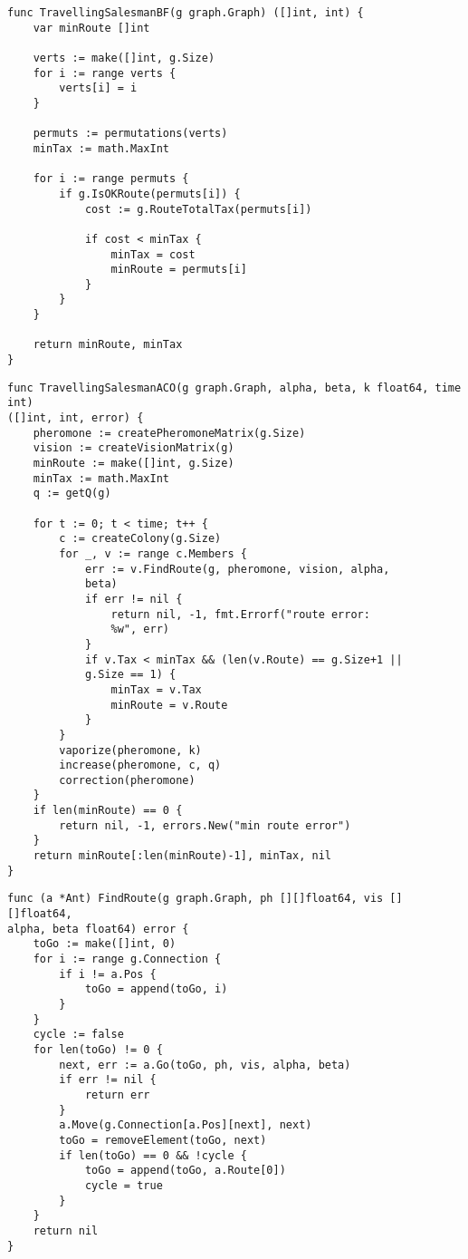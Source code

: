 \begin{code}
\caption{Листинг функции реализации алгоритма полного перебора для решения задачи коммивояджёра}
\label{code:bf}
\begin{verbatim}
func TravellingSalesmanBF(g graph.Graph) ([]int, int) {
	var minRoute []int
	
	verts := make([]int, g.Size)
	for i := range verts {
		verts[i] = i
	}

	permuts := permutations(verts)
	minTax := math.MaxInt
	
	for i := range permuts {
		if g.IsOKRoute(permuts[i]) {
			cost := g.RouteTotalTax(permuts[i])
			
			if cost < minTax {
				minTax = cost
				minRoute = permuts[i]
			}
		}
	}
	
	return minRoute, minTax
}
\end{verbatim}
\end{code}

\newpage

\begin{code}
\caption{Листинг функции реализации муравьиного алгоритма для решения задачи коммивояджёра}
\label{code:aco}
\begin{verbatim}
func TravellingSalesmanACO(g graph.Graph, alpha, beta, k float64, time int) 
([]int, int, error) { 
	pheromone := createPheromoneMatrix(g.Size)
	vision := createVisionMatrix(g)
	minRoute := make([]int, g.Size)
	minTax := math.MaxInt
	q := getQ(g)

	for t := 0; t < time; t++ {
		c := createColony(g.Size)
		for _, v := range c.Members {
			err := v.FindRoute(g, pheromone, vision, alpha, 
			beta)
			if err != nil {
				return nil, -1, fmt.Errorf("route error: 
				%w", err)
			}
			if v.Tax < minTax && (len(v.Route) == g.Size+1 || 
			g.Size == 1) {
				minTax = v.Tax
				minRoute = v.Route
			}
		}
		vaporize(pheromone, k)
		increase(pheromone, c, q)
		correction(pheromone)
	}
	if len(minRoute) == 0 {
		return nil, -1, errors.New("min route error")
	}
	return minRoute[:len(minRoute)-1], minTax, nil
}
\end{verbatim}
\end{code}

\begin{code}
\caption{Листинг функции реализации поиска муравьём маршрута}
\label{code:route}
\begin{verbatim}
func (a *Ant) FindRoute(g graph.Graph, ph [][]float64, vis [][]float64, 
alpha, beta float64) error {
	toGo := make([]int, 0)
	for i := range g.Connection {
		if i != a.Pos {
			toGo = append(toGo, i)
		}
	}
	cycle := false
	for len(toGo) != 0 {
		next, err := a.Go(toGo, ph, vis, alpha, beta)
		if err != nil {
			return err
		}
		a.Move(g.Connection[a.Pos][next], next)
		toGo = removeElement(toGo, next)
		if len(toGo) == 0 && !cycle {
			toGo = append(toGo, a.Route[0])
			cycle = true
		}
	}
	return nil
}
\end{verbatim}
\end{code}

